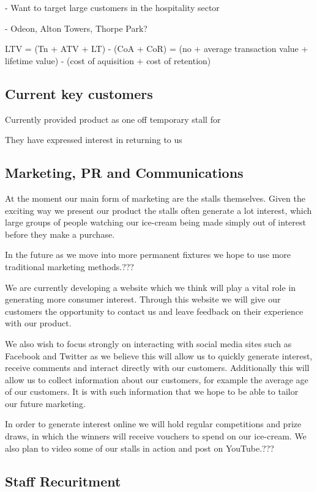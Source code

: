 \documentclass{article}
\begin{document}
 - Want to target large customers in the hospitality sector

 - Odeon, Alton Towers, Thorpe Park?

   LTV = (Tn + ATV + LT) - (CoA + CoR)
       = (no + average transaction value + lifetime value) - (cost of aquisition + cost of retention) 

  \subsection{Current key customers}

  Currently provided product as one off temporary stall for 

  They have expressed interest in returning to us

  \subsection{Marketing, PR and Communications}
  At the moment our main form of marketing are the stalls themselves.
Given the exciting way we present our product the stalls often generate
a lot interest, which large groups of people watching our ice-cream
being made simply out of interest before they make a purchase.

In the future as we move into more permanent fixtures we hope to use
more traditional marketing methods.???

We are currently developing a website which we think will play a vital
role in generating more consumer interest. Through this website we will
give our customers the opportunity to contact us and leave feedback on
their experience with our product.

We also wish to focus strongly on interacting with social media sites
such as Facebook and Twitter as we believe this will allow us to quickly
generate interest, receive comments and interact directly with our
customers. Additionally this will allow us to collect information about
our customers, for example the average age of our customers. It is with
such information that we hope to be able to tailor our future marketing.

In order to generate interest online we will hold regular competitions
and prize draws, in which the winners will receive vouchers to spend on
our ice-cream. We also plan to video some of our stalls in action and
post on YouTube.???

  \subsection{Staff Recuritment}
\end{document}
